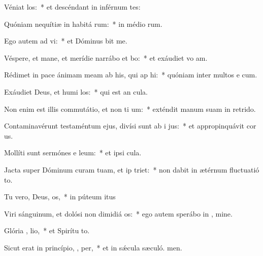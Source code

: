 \item Véniat   los:~* et descéndant in inférnum tes:
\item Quóniam nequítiæ in habitá rum:~* in médio rum.
\item Ego autem ad  vi:~* et Dóminus bit me.
\item Véspere, et mane, et merídie narrábo et bo:~* et exáudiet vo am.
\item Rédimet in pace ánimam meam ab his, qui ap hi:~* quóniam inter multos e cum.
\item Exáudiet Deus, et humi los:~* qui est an cula.
\item Non enim est illis commutátio, et non ti um:~* exténdit manum suam in retrido.
\item Contaminavérunt testaméntum ejus, divísi sunt ab i  jus:~* et appropinquávit cor us.
\item Mollíti sunt sermónes e  leum:~* et ipsi  cula.
\item Jacta super Dóminum curam tuam, et ip  triet:~* non dabit in ætérnum fluctuatió to.
\item Tu vero, Deus,  os,~* in púteum itus
\item Viri sánguinum, et dolósi non dimidiá  os:~* ego autem sperábo in , mine.
\item Glória ,  lio,~* et Spirítu to.
\item Sicut erat in princípio,  ,  per,~* et in sǽcula sæculó. men.
